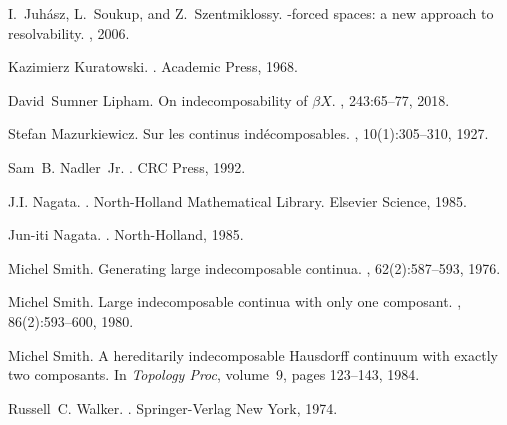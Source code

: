 \documentclass[12pt]{article}
\theoremstyle{plain}
\theoremstyle{definition}
\newcommand{\0}{\ensuremath{\varnothing}}
\begin{document}
\begin{thebibliography}{10}
		I.~{Juh\' asz}, L.~{Soukup}, and Z.~{Szentmiklossy}.
		-forced spaces: a new approach to resolvability.
		, 2006.
		
		Kazimierz Kuratowski.
		.
		\newblock Academic Press, 1968.
		
		David~Sumner Lipham.
		\newblock On indecomposability of {$\beta X$}.
		, 243:65--77, 2018.
		
		Stefan Mazurkiewicz.
		\newblock Sur les continus ind\'ecomposables.
		, 10(1):305--310, 1927.
		
		Sam~B. Nadler~Jr.
		.
		\newblock CRC Press, 1992.
		
		J.I. Nagata.
		.
		\newblock North-Holland Mathematical Library. Elsevier Science, 1985.
		
		{Jun-iti} Nagata.
		.
		\newblock North-Holland, 1985.
		
		Michel Smith.
		\newblock Generating large indecomposable continua.
		, 62(2):587--593, 1976.
		
		Michel Smith.
		\newblock Large indecomposable continua with only one composant.
		, 86(2):593--600, 1980.
		
		Michel Smith.
		\newblock A hereditarily indecomposable {H}ausdorff continuum with exactly two
		composants.
		\newblock In {\em Topology Proc}, volume~9, pages 123--143, 1984.
		
		Russell~C. Walker.
		.
		\newblock Springer-Verlag New York, 1974.
		
	\end{thebibliography}
	
\end{document}
